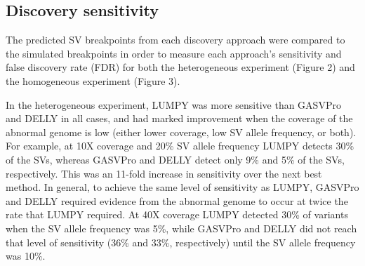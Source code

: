 \documentclass[10pt]{bmc_article}
\newenvironment{bmcformat}{\begin{raggedright}\baselineskip20pt\sloppy\setboolean{publ}{false}}{\end{raggedright}\baselineskip20pt\sloppy}
\begin{document}
\begin{bmcformat}

\subsection*{Discovery sensitivity}
The predicted SV breakpoints from each discovery approach were compared to the
simulated breakpoints in order to measure each approach’s sensitivity and false
discovery rate (FDR) for both the heterogeneous experiment (Figure 2) and the
homogeneous experiment (Figure 3).

In the heterogeneous experiment, LUMPY was more sensitive than GASVPro and DELLY
in all cases, and had marked improvement when the coverage of the abnormal
genome is low (either lower coverage, low SV allele frequency, or both).  For
example, at 10X coverage and 20\% SV allele frequency LUMPY detects 30\% of the
SVs, whereas GASVPro and DELLY detect only 9\% and 5\% of the SVs, respectively.
This was an 11-fold increase in sensitivity over the next best method.  In
general, to achieve the same level of sensitivity as LUMPY, GASVPro and DELLY
required evidence from the abnormal genome to occur at twice the rate that LUMPY
required.  At 40X coverage LUMPY detected 30\% of variants when the SV allele
frequency was 5\%, while GASVPro and DELLY did not reach that level of
sensitivity (36\% and 33\%, respectively) until the SV allele frequency was
10\%.


\end{bmcformat}
\end{document}
